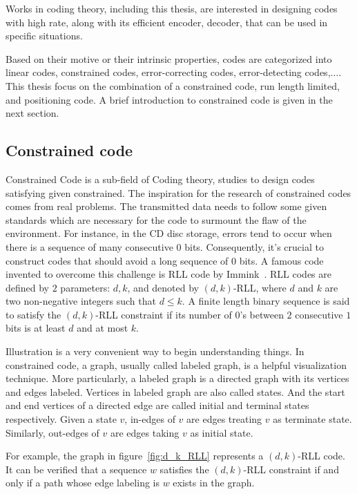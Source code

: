 Works in coding theory, including this thesis, are interested in designing codes with high rate, along with its efficient encoder, decoder, that can be used in specific situations. 

Based on their motive or their intrinsic properties, codes are categorized into linear codes, constrained codes, error-correcting codes, error-detecting codes,$\ldots$. This thesis focus on the combination of a constrained code, run length limited, and positioning code. A brief introduction to constrained code is given in the next section.

\subsection{Constrained code}\label{subsec:constrained_code}
Constrained Code is a sub-field of Coding theory, studies to design codes satisfying given constrained. The inspiration for the research of constrained codes comes from real problems. The transmitted data needs to follow some given standards which are necessary for the code to surmount the flaw of the environment. For instance, in the CD disc storage, errors tend to occur when there is a sequence of many consecutive $0$ bits. Consequently, it's crucial to construct codes that should avoid a long sequence of $0$ bits. A famous code invented to overcome this challenge is \gls{RLL} code by Immink~\cite{immink1990runlength}. \gls{RLL} codes are defined by $2$ parameters: $d, k$, and denoted by $(d,k)$-RLL, where $d$ and $k$ are two non-negative integers such that $d\leq k$. A finite length binary sequence 
is said to satisfy the $(d,k)$-RLL constraint if its number of $0$'s between $2$ consecutive $1$ bits is at least $d$ and at most $k$.

Illustration is a very convenient way to begin understanding things. In constrained code, a graph, usually called labeled graph, is a helpful visualization technique. More particularly, a labeled graph is a directed graph with its vertices and edges labeled. Vertices in labeled graph are also called states. And the start and end vertices of a directed edge are called initial and terminal states respectively. Given a state $v$, in-edges of $v$ are edges treating $v$ as terminate state. Similarly, out-edges of $v$ are edges taking $v$ as initial state. 

For example, the graph in figure~\ref{fig:d_k_RLL} represents a $(d,k)$-RLL code. It can be verified that a sequence $w$ satisfies the $(d,k)$-RLL constraint if and only if a path whose edge labeling is $w$ exists in the graph.

